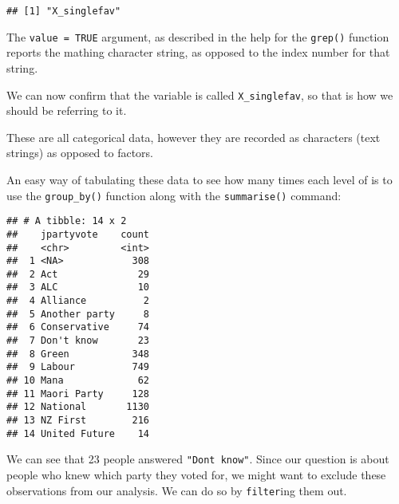 \documentclass[]{article}
\newenvironment{Shaded}{\begin{snugshade}}{\end{snugshade}}
\newcommand{\KeywordTok}[1]{\textcolor[rgb]{0.13,0.29,0.53}{\textbf{#1}}}
\newcommand{\DataTypeTok}[1]{\textcolor[rgb]{0.13,0.29,0.53}{#1}}
\newcommand{\StringTok}[1]{\textcolor[rgb]{0.31,0.60,0.02}{#1}}
\newcommand{\OperatorTok}[1]{\textcolor[rgb]{0.81,0.36,0.00}{\textbf{#1}}}
\newcommand{\NormalTok}[1]{#1}
\begin{document}
\begin{verbatim}
## [1] "X_singlefav"
\end{verbatim}

The \texttt{value\ =\ TRUE} argument, as described in the help for the
\texttt{grep()} function reports the mathing character string, as
opposed to the index number for that string.

We can now confirm that the variable is called \texttt{X\_singlefav}, so
that is how we should be referring to it.

\begin{Shaded}
\end{Shaded}

These are all categorical data, however they are recorded as characters
(text strings) as opposed to factors.

An easy way of tabulating these data to see how many times each level of
is to use the \texttt{group\_by()} function along with the
\texttt{summarise()} command:

\begin{Shaded}
\end{Shaded}

\begin{verbatim}
## # A tibble: 14 x 2
##    jpartyvote    count
##    <chr>         <int>
##  1 <NA>            308
##  2 Act              29
##  3 ALC              10
##  4 Alliance          2
##  5 Another party     8
##  6 Conservative     74
##  7 Don't know       23
##  8 Green           348
##  9 Labour          749
## 10 Mana             62
## 11 Maori Party     128
## 12 National       1130
## 13 NZ First        216
## 14 United Future    14
\end{verbatim}

We can see that 23 people answered
\texttt{"Don\textquotesingle{}t\ know"}. Since our question is about
people who knew which party they voted for, we might want to exclude
these observations from our analysis. We can do so by \texttt{filter}ing
them out.
\end{document}
